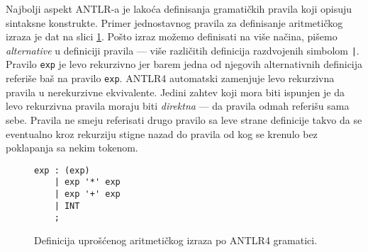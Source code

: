 Najbolji aspekt ANTLR-a je lakoća definisanja gramatičkih pravila koji opisuju sintaksne konstrukte. Primer jednostavnog pravila za definisanje aritmetičkog izraza je dat na slici \ref{fig:ANTLRExpressions}. Pošto izraz možemo definisati na više načina, pišemo \emph{alternative} u definiciji pravila --- više različitih definicija razdvojenih simbolom \texttt{|}. Pravilo \texttt{exp} je levo rekurzivno jer barem jedna od njegovih alternativnih definicija referiše baš na pravilo \texttt{exp}. ANTLR4 automatski zamenjuje levo rekurzivna pravila u nerekurzivne ekvivalente. Jedini zahtev koji mora biti ispunjen je da levo rekurzivna pravila moraju biti \emph{direktna} --- da pravila odmah referišu sama sebe. Pravila ne smeju referisati drugo pravilo sa leve strane definicije takvo da se eventualno kroz rekurziju stigne nazad do pravila od kog se krenulo bez poklapanja sa nekim tokenom.

\begin{figure}[h!]
\begin{lstlisting}[language={}]
exp : (exp)
    | exp '*' exp
    | exp '+' exp
    | INT
    ;
\end{lstlisting}
\caption{Definicija uprošćenog aritmetičkog izraza po ANTLR4 gramatici.}
\label{fig:ANTLRExpressions}
\end{figure}
